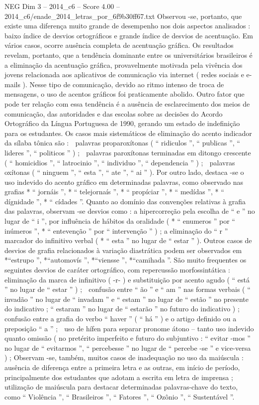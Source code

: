 \begin{textsample}{NEG Dim 3 – 2014\_c6 – Score 4.00 – 2014\_c6/enade\_2014\_letras\_por\_6f9b30ff67.txt}
Observou -se, portanto, que existe uma diferença muito grande de desempenho nos dois aspectos analisados : baixo índice de desvios ortográficos e grande índice de desvios de acentuação.
Em vários casos, ocorre ausência completa de acentuação gráfica.
Os resultados revelam, portanto, que a tendência dominante entre os universitários brasileiros é a eliminação da acentuação gráfica, provavelmente motivada pela vivência dos jovens relacionada aos aplicativos de comunicação via internet ( redes sociais e e-mails ).
Nesse tipo de comunicação, devido ao ritmo intenso de troca de mensagens, o uso de acentos gráficos foi praticamente abolido.
Outro fator que pode ter relação com essa tendência é a ausência de esclarecimento dos meios de comunicação, das autoridades e das escolas sobre as decisões do Acordo Ortográfico da Língua Portuguesa de 1990, gerando um estado de indefinição para os estudantes.
Os casos mais sistemáticos de eliminação do acento indicador da sílaba tônica são :  palavras proparoxítonas ( “ ridiculos ”, “ publicas ”, “ lideres ”, “ politicos ” ) ;  palavras paroxítonas terminadas em ditongo crescente ( “ homicidios ”, “ latrocinio ”, “ individuo ”, “ dependencia ” ) ;  palavras oxítonas ( “ ninguem ”, “ esta ”, “ ate ”, “ ai ” ).
Por outro lado, destaca -se o uso indevido do acento gráfico em determinadas palavras, como observado nas grafias * “ jornáis ”, * “ telejornaís ”, * “ propíciar ”, * “ medídas ”, * “ dígnidade ”, * “ cídades ”.
Quanto ao domínio das convenções relativas à grafia das palavras, observam -se desvios como : a hipercorreção pela escolha de “ e ” no lugar de “ i ”, por influência de hábitos da oralidade ( * “ enumeros ” por “ inúmeros ”, * “ entevenção ” por “ intervenção ” ) ; a eliminação do “ r ” marcador do infinitivo verbal ( * “ esta ” no lugar de “ estar ” ).
Outros casos de desvios de grafia relacionados à variação diastrática podem ser observados em *“estrupo ”, *“automovís ”, *“viensse ”, *“camihada ”.
São muito frequentes os seguintes desvios de caráter ortográfico, com repercussão morfossintática :  eliminação da marca de infinitivo ( -r- ) e substituição por acento agudo ( “ está ” no lugar de “ estar ” ) ;  confusão entre “ ão ” e “ am ” nas formas verbais ( “ invadão ” no lugar de “ invadam ” e “ estam ” no lugar de “ estão ” no presente do indicativo ; “ estaram ” no lugar de “ estarão ” no futuro do indicativo ) ;  confusão entre a grafia do verbo “ haver ” ( “ há ” ) e o artigo definido ou a preposição “ a ” ;  uso de hífen para separar pronome átono – tanto uso indevido quanto omissão ( no pretérito imperfeito e futuro do subjuntivo : “ evitar -mos ” no lugar de “ evitarmos ”, “ percebesse ” no lugar de “ percebe -se ” e vice-versa ) ; Observam -se, também, muitos casos de inadequação no uso da maiúscula : ausência de diferença entre a primeira letra e as outras, em início de período, principalmente dos estudantes que adotam a escrita em letra de imprensa ; utilização de maiúscula para destacar determinadas palavras-chave do texto, como “ Violência ”, “ Brasileiros ”, “ Fatores ”, “ Ozônio ”, “ Sustentável ”.

\end{textsample}
